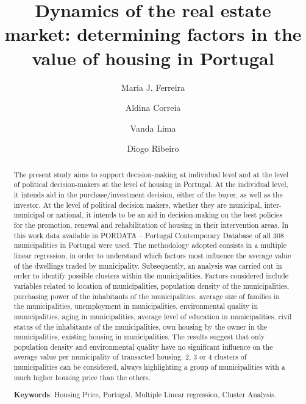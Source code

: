 \documentclass{aip-cp}
\begin{document}
\title{Dynamics of the real estate market: determining factors in the value of housing in Portugal}

\author[aff1]{Maria J. Ferreira}
\author[aff1]{Aldina Correia}

\author[aff1]{Vanda Lima}
\author[aff2]{Diogo Ribeiro}

\maketitle

\begin{abstract}
The present study aims to support decision-making at individual level and at the level of political decision-makers at the level of housing in Portugal. At the individual level, it intends aid in the purchase/investment decision, either of the buyer, as well as the investor.
At the level of political decision makers, whether they are municipal, inter-municipal or national, it intends to be an aid in decision-making on the best policies for the promotion, renewal and rehabilitation of housing in their intervention areas.
In this work data available in PORDATA -- Portugal Contemporary Database of all 308 municipalities in Portugal were used. The methodology adopted consists in a multiple linear regression, in order to understand which factors most influence the average value of the dwellings traded by municipality. Subsequently, an analysis was carried out in order to identify possible clusters within the municipalities.
Factors considered include variables related to location of municipalities, population density of the municipalities, purchasing power of the inhabitants of the municipalities, average size of families in the municipalities, unemployment in municipalities, environmental quality in municipalities, aging in municipalities, average level of education in municipalities, civil status of the inhabitants of the municipalities, own housing by the owner in the municipalities, existing housing in municipalities. 
The results suggest that only population density and environmental quality have no significant influence on the average value per municipality of transacted housing. 2, 3 or 4 clusters of municipalities can be considered, always highlighting a group of municipalities with a much higher housing price than the others.

\textbf{Keywords}: Housing Price, Portugal, Multiple Linear regression, Cluster Analysis.
\end{abstract}
\end{document}

